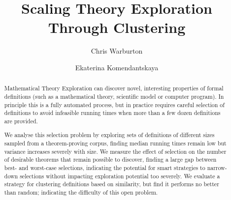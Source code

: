 \documentclass[]{article}
\begin{document}
\mainmatter  %

\title{Scaling Theory Exploration Through Clustering}


%
%
\author{Chris Warburton%
\and Ekaterina Komendantskaya}
%


%
%

\maketitle

\begin{abstract}
  Mathematical Theory Exploration can discover novel, interesting properties of
  formal definitions (such as a mathematical theory, scientific model or
  computer program). In principle this is a fully automated process, but in
  practice requires careful selection of definitions to avoid infeasible running
  times when more than a few dozen definitions are provided.

  We analyse this selection problem by exploring sets of definitions of
  different sizes sampled from a theorem-proving corpus, finding median running
  times remain low but variance increases severely with size. We measure the
  effect of selection on the number of desirable theorems that remain possible
  to discover, finding a large gap between best- and worst-case selections,
  indicating the potential for smart strategies to narrow-down selections
  without impacting exploration potential too severely. We evaluate a strategy
  for clustering definitions based on similarity, but find it performs no better
  than random; indicating the difficulty of this open problem.
\end{abstract}
\end{document}
